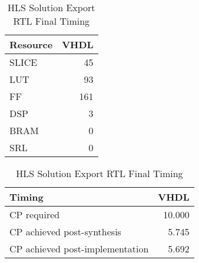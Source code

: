 \begin{table}[H]
	\centering
	\begin{minipage}[t]{0.45\linewidth}
		\centering
		\begin{tabular}{|l|r|}
			\hline
			\textbf{Resource} & \textbf{VHDL} \\
			\hline
			SLICE & 45 \\
			\hline
			LUT & 93 \\
			\hline
			FF & 161 \\
			\hline
			DSP & 3 \\
			\hline
			BRAM & 0 \\
			\hline
			SRL & 0 \\
			\hline
		\end{tabular}
		\caption{HLS Solution 1 Export RTL Resource Usage}
		\label{tab:hls-solution-1-export-rtl-resoruce-usage}
	\end{minipage}
	\hfill
	\begin{minipage}[t]{0.45\linewidth}
		\centering
		\begin{tabular}{|l|r|}
			\hline
			\textbf{Timing} & \textbf{VHDL} \\
			\hline
			CP required & 10.000 \\
			\hline
			CP achieved post-synthesis & 5.745 \\
			\hline
			CP achieved post-implementation & 5.692 \\
			\hline
		\end{tabular}
		\caption{HLS Solution Export RTL Final Timing}
		\label{tab:hls-solution-1-export-rtl-final-timing}
	\end{minipage}
\end{table}